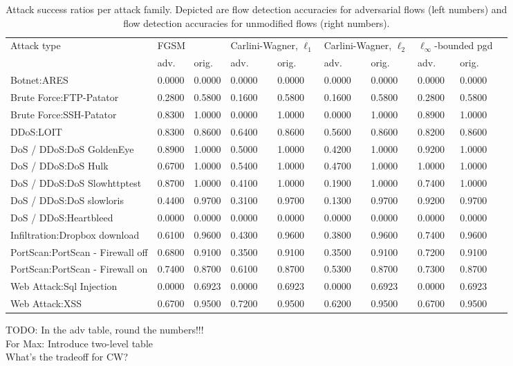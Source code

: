 \documentclass[conference]{IEEEtran}
\newcommand\note[2]{{\color{#1}#2}}
\newcommand\todo[1]{{\note{red}{TODO: #1}}}
\begin{document}
\begin{table}
\caption{Attack success ratios per attack family. Depicted are flow detection accuracies for adversarial flows (left numbers) and flow detection accuracies for unmodified flows (right numbers).}
\label{tab:adv_per_family}
\centering
\begin{tabular}{llllllllll}
\toprule
Attack type & \multicolumn{2}{l}{FGSM} & \multicolumn{2}{l}{Carlini-Wagner, $\ell_1$} & \multicolumn{2}{l}{Carlini-Wagner, $\ell_2$} & \multicolumn{2}{l}{$\ell_\infty$-bounded \gls{pgd}} \\
\cmidrule(r){2-3} \cmidrule(lr){4-5} \cmidrule(l){6-7} \cmidrule(l){8-9}
& adv. & orig. & adv. & orig. & adv. & orig. & adv. & orig. \\
\midrule
Botnet:ARES	&	0.0000 & 0.0000	&	0.0000 & 0.0000	&	0.0000 & 0.0000	&	0.0000 & 0.0000	\\
Brute Force:FTP-Patator	&	0.2800 & 0.5800	&	0.1600 & 0.5800	&	0.1600 & 0.5800	&	0.2800 & 0.5800	\\
Brute Force:SSH-Patator	&	0.8300 & 1.0000	&	0.0000 & 1.0000	&	0.0000 & 1.0000	&	0.8900 & 1.0000	\\
DDoS:LOIT	&	0.8300 & 0.8600	&	0.6400 & 0.8600	&	0.5600 & 0.8600	&	0.8200 & 0.8600	\\
DoS / DDoS:DoS GoldenEye	&	0.8900 & 1.0000	&	0.5000 & 1.0000	&	0.4200 & 1.0000	&	0.9200 & 1.0000	\\
DoS / DDoS:DoS Hulk	&	0.6700 & 1.0000	&	0.5400 & 1.0000	&	0.4700 & 1.0000	&	1.0000 & 1.0000	\\
DoS / DDoS:DoS Slowhttptest	&	0.8700 & 1.0000	&	0.4100 & 1.0000	&	0.1900 & 1.0000	&	0.7400 & 1.0000	\\
DoS / DDoS:DoS slowloris	&	0.4400 & 0.9700	&	0.3100 & 0.9700	&	0.1300 & 0.9700	&	0.9200 & 0.9700	\\
DoS / DDoS:Heartbleed	&	0.0000 & 0.0000	&	0.0000 & 0.0000	&	0.0000 & 0.0000	&	0.0000 & 0.0000	\\
Infiltration:Dropbox download 	&	0.6100 & 0.9600	&	0.4300 & 0.9600	&	0.3800 & 0.9600	&	0.7400 & 0.9600	\\
PortScan:PortScan - Firewall off	&	0.6800 & 0.9100	&	0.3500 & 0.9100	&	0.3500 & 0.9100	&	0.7200 & 0.9100	\\
PortScan:PortScan - Firewall on	&	0.7400 & 0.8700	&	0.6100 & 0.8700	&	0.5300 & 0.8700	&	0.7300 & 0.8700	\\
Web Attack:Sql Injection	&	0.0000 & 0.6923	&	0.0000 & 0.6923	&	0.0000 & 0.6923	&	0.0000 & 0.6923	\\
Web Attack:XSS	&	0.6700 & 0.9500	&	0.7200 & 0.9500	&	0.6200 & 0.9500	&	0.6700 & 0.9500	\\
\bottomrule

\end{tabular}

\todo{In the adv table, round the numbers!!! \\
For Max: Introduce two-level table\\
What's the tradeoff for CW?}
\end{table}
\end{document}
